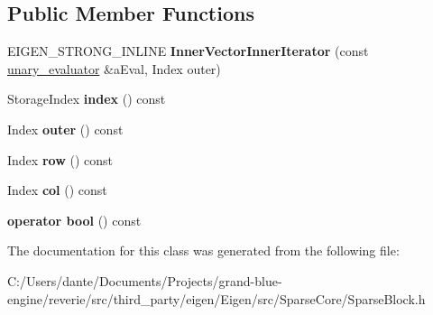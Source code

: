 \subsection*{Public Member Functions}
\begin{DoxyCompactItemize}
\item 
\mbox{\label{class_eigen_1_1internal_1_1unary__evaluator_3_01_block_3_01_arg_type_00_01_block_rows_00_01_bloc7b8c3454e32b582bbd24168a4ea19a1b_a8f37ee828c4c3b46870a96e3a7e7f452}} 
E\+I\+G\+E\+N\+\_\+\+S\+T\+R\+O\+N\+G\+\_\+\+I\+N\+L\+I\+NE {\bfseries Inner\+Vector\+Inner\+Iterator} (const \mbox{\hyperlink{struct_eigen_1_1internal_1_1unary__evaluator}{unary\+\_\+evaluator}} \&a\+Eval, Index outer)
\item 
\mbox{\label{class_eigen_1_1internal_1_1unary__evaluator_3_01_block_3_01_arg_type_00_01_block_rows_00_01_bloc7b8c3454e32b582bbd24168a4ea19a1b_aa1c7f48b58850b04e31d1918242d9065}} 
Storage\+Index {\bfseries index} () const
\item 
\mbox{\label{class_eigen_1_1internal_1_1unary__evaluator_3_01_block_3_01_arg_type_00_01_block_rows_00_01_bloc7b8c3454e32b582bbd24168a4ea19a1b_a83ae43e0c18576a40fc1453eaed46bac}} 
Index {\bfseries outer} () const
\item 
\mbox{\label{class_eigen_1_1internal_1_1unary__evaluator_3_01_block_3_01_arg_type_00_01_block_rows_00_01_bloc7b8c3454e32b582bbd24168a4ea19a1b_a02e33437f09205b2cc5e4613958ac9e8}} 
Index {\bfseries row} () const
\item 
\mbox{\label{class_eigen_1_1internal_1_1unary__evaluator_3_01_block_3_01_arg_type_00_01_block_rows_00_01_bloc7b8c3454e32b582bbd24168a4ea19a1b_af96c95c3b860dabfa9a00743c58e59e5}} 
Index {\bfseries col} () const
\item 
\mbox{\label{class_eigen_1_1internal_1_1unary__evaluator_3_01_block_3_01_arg_type_00_01_block_rows_00_01_bloc7b8c3454e32b582bbd24168a4ea19a1b_a902176e844e2c0dd52846acab1d54989}} 
{\bfseries operator bool} () const
\end{DoxyCompactItemize}


The documentation for this class was generated from the following file\+:\begin{DoxyCompactItemize}
\item 
C\+:/\+Users/dante/\+Documents/\+Projects/grand-\/blue-\/engine/reverie/src/third\+\_\+party/eigen/\+Eigen/src/\+Sparse\+Core/Sparse\+Block.\+h\end{DoxyCompactItemize}
